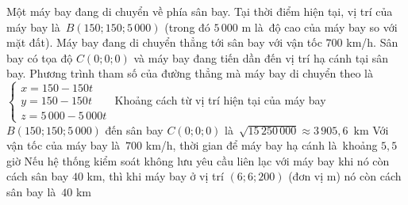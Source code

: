 \begin{ex}%
	Một máy bay đang di chuyển về phía sân bay. Tại thời điểm hiện tại,  vị trí của máy bay là~$B(150;150;5\,000)$ (trong đó $5\,000$ m là~độ cao của máy bay so với mặt đất). Máy bay đang di chuyển thẳng tới sân bay với vận tốc $700$ km/h. Sân bay có tọa độ $C(0;0;0)$ và máy bay đang tiến dần đến vị trí hạ cánh tại sân bay.
	 \choiceTF
		{Phương trình tham số của đường thẳng mà máy bay di chuyển theo là~$\begin{cases}
		x =  150 - 150t \\
		y  = 150 - 150t \\
		z  = 5\,000 - 5\,000t
\end{cases}
$} 
{Khoảng cách từ vị trí hiện  tại của máy bay $B(150;150;5\,000)$ đến sân bay $C(0;0;0)$ là~$\sqrt{15\,250\,000} \approx 3\,905{,}6 \, \text{ km}$}
{Với vận tốc của  máy bay là~$700$ km/h, thời gian để máy bay hạ cánh là~khoảng $5{,}5$ giờ}
{\True Nếu hệ thống kiểm soát không lưu yêu cầu liên lạc với máy bay khi nó còn cách sân bay $40$ km, thì khi máy bay ở vị trí $(6;6;200)$ (đơn vị m) nó  còn cách sân bay là~$40$ km}
\end{ex}

